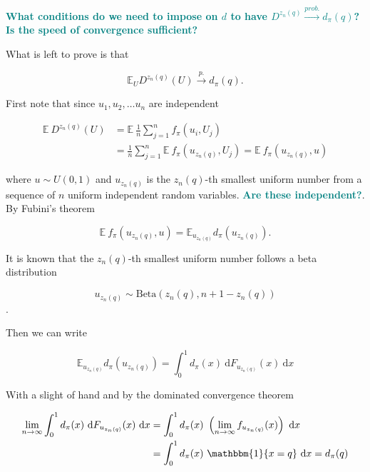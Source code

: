 \documentclass[american, abstract=on]{scrartcl}
\newcommand{\E}{\mathbb{E}}
\newcommand{\uI}[2][s]{\int^1_0 #2 \ \text{d} #1}
\newcommand\notes[1]{\textcolor{teal}{\textbf{#1}}}
\begin{document}
\notes{What conditions do we need to impose on $d$ to have $D^{z_n(q)} \xrightarrow{prob.} d_\pi(q)$? Is the speed of convergence sufficient?}

\iffalse

What is left to prove is that 

\begin{equation}
  \E_{U} D^{z_n(q)}(U) \xrightarrow{p.} d_\pi(q).
\end{equation}

First note that since $u_1, u_2, \ldots u_n$ are independent

\begin{equation}
  \begin{split}
    \E \ D^{z_n(q)}(U) &= \E \ \frac{1}{n} \sum^n_{j = 1} f_{\pi}(u_i, U_j) \\
    &= \frac{1}{n} \sum^n_{j = 1} \E \ f_{\pi}(u_{z_n(q)}, U_j) = \E \ f_{\pi}(u_{z_n(q)}, u)
  \end{split}
\end{equation}

where $u \sim U(0, 1)$ and $u_{z_n(q)}$ is the $z_n(q)$-th smallest uniform number from a sequence of $n$ uniform independent random variables. \notes{Are these independent?}. By Fubini's theorem

\begin{equation}
  \E \ f_{\pi}(u_{z_n(q)}, u) = \E_{u_{z_n(q)}} d_\pi(u_{z_n(q)}).
\end{equation}

It is known that the $z_n(q)$-th smallest uniform number follows a beta distribution

\begin{equation}
  u_{z_n(q)} \sim \text{Beta}(z_n(q), n + 1 - z_n(q))
\end{equation}.

Then we can write 

\begin{equation}
  \E_{u_{z_n(q)}} d_\pi(u_{z_n(q)}) = \uI[x]{d_\pi(x) \ \text{d}F_{u_{z_n(q)}}(x)}
\end{equation}

With a slight of hand and by the dominated convergence theorem

\begin{equation}
  \begin{split}
    \lim_{n \rightarrow \infty} \uI[x]{d_\pi(x) \ \text{d}F_{u_{z_n(q)}}(x)} &= \uI[x]{d_\pi(x) \ \left( \lim_{n \rightarrow \infty} f_{u_{z_n(q)}}(x)\right)} \\
    &= \uI[x]{d_\pi(x) \ \mathbbm{1}\{x = q\}} = d_\pi(q)
  \end{split}
\end{equation}
\end{document}

